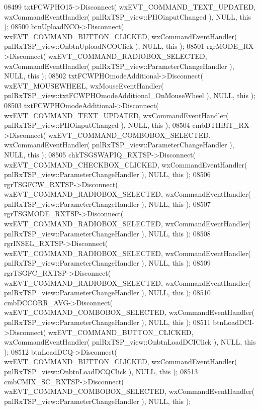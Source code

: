 \begin{DoxyCode}
08499     txtFCWPHO15->Disconnect( wxEVT\_COMMAND\_TEXT\_UPDATED, wxCommandEventHandler( 
      pnlRxTSP_view::PHOinputChanged ), NULL, \textcolor{keyword}{this} );
08500     btnUploadNCO->Disconnect( wxEVT\_COMMAND\_BUTTON\_CLICKED, wxCommandEventHandler( 
      pnlRxTSP_view::OnbtnUploadNCOClick ), NULL, \textcolor{keyword}{this} );
08501     rgrMODE_RX->Disconnect( wxEVT\_COMMAND\_RADIOBOX\_SELECTED, wxCommandEventHandler( 
      pnlRxTSP_view::ParameterChangeHandler ), NULL, \textcolor{keyword}{this} );
08502     txtFCWPHOmodeAdditional->Disconnect( wxEVT\_MOUSEWHEEL, wxMouseEventHandler( 
      pnlRxTSP_view::txtFCWPHOmodeAdditional_OnMouseWheel ), NULL, \textcolor{keyword}{this} );
08503     txtFCWPHOmodeAdditional->Disconnect( wxEVT\_COMMAND\_TEXT\_UPDATED, wxCommandEventHandler( 
      pnlRxTSP_view::PHOinputChanged ), NULL, \textcolor{keyword}{this} );
08504     cmbDTHBIT_RX->Disconnect( wxEVT\_COMMAND\_COMBOBOX\_SELECTED, wxCommandEventHandler( 
      pnlRxTSP_view::ParameterChangeHandler ), NULL, \textcolor{keyword}{this} );
08505     chkTSGSWAPIQ_RXTSP->Disconnect( wxEVT\_COMMAND\_CHECKBOX\_CLICKED, wxCommandEventHandler( 
      pnlRxTSP_view::ParameterChangeHandler ), NULL, \textcolor{keyword}{this} );
08506     rgrTSGFCW_RXTSP->Disconnect( wxEVT\_COMMAND\_RADIOBOX\_SELECTED, wxCommandEventHandler( 
      pnlRxTSP_view::ParameterChangeHandler ), NULL, \textcolor{keyword}{this} );
08507     rgrTSGMODE_RXTSP->Disconnect( wxEVT\_COMMAND\_RADIOBOX\_SELECTED, wxCommandEventHandler( 
      pnlRxTSP_view::ParameterChangeHandler ), NULL, \textcolor{keyword}{this} );
08508     rgrINSEL_RXTSP->Disconnect( wxEVT\_COMMAND\_RADIOBOX\_SELECTED, wxCommandEventHandler( 
      pnlRxTSP_view::ParameterChangeHandler ), NULL, \textcolor{keyword}{this} );
08509     rgrTSGFC_RXTSP->Disconnect( wxEVT\_COMMAND\_RADIOBOX\_SELECTED, wxCommandEventHandler( 
      pnlRxTSP_view::ParameterChangeHandler ), NULL, \textcolor{keyword}{this} );
08510     cmbDCCORR_AVG->Disconnect( wxEVT\_COMMAND\_COMBOBOX\_SELECTED, wxCommandEventHandler( 
      pnlRxTSP_view::ParameterChangeHandler ), NULL, \textcolor{keyword}{this} );
08511     btnLoadDCI->Disconnect( wxEVT\_COMMAND\_BUTTON\_CLICKED, wxCommandEventHandler( 
      pnlRxTSP_view::OnbtnLoadDCIClick ), NULL, \textcolor{keyword}{this} );
08512     btnLoadDCQ->Disconnect( wxEVT\_COMMAND\_BUTTON\_CLICKED, wxCommandEventHandler( 
      pnlRxTSP_view::OnbtnLoadDCQClick ), NULL, \textcolor{keyword}{this} );
08513     cmbCMIX_SC_RXTSP->Disconnect( wxEVT\_COMMAND\_COMBOBOX\_SELECTED, wxCommandEventHandler( 
      pnlRxTSP_view::ParameterChangeHandler ), NULL, \textcolor{keyword}{this} );

\end{DoxyCode}
